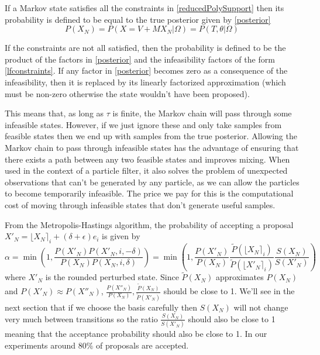 \documentclass{article}
\begin{document}
If a Markov state satisfies all the constraints in \eqref{reducedPolySupport} then its probability is defined to be equal to the true posterior given by \eqref{posterior}
\[
P(X_N) = P(X=V + MX_N|\Omega) = P(T,\theta|\Omega)
\]

If the constraints are not all satisfied, then the probability is defined to be the product of the factors in \eqref{posterior} and the infeasibility factors of the form \eqref{lfconstraints}. If any factor in \eqref{posterior} becomes zero as a consequence of the infeasibility, then it is replaced by its linearly factorized approximation (which must be non-zero otherwise the state wouldn't have been proposed).

This means that, as long as $\tau$ is finite, the Markov chain will pass through some infeasible states. However, if we just ignore these and only take samples from feasible states then we end up with samples from the true posterior. Allowing the Markov chain to pass through infeasible states has the advantage of ensuring that there exists a path between any two feasible states and improves mixing. When used in the context of a particle filter, it also solves the problem of unexpected observations that can't be generated by any particle, as we can allow the particles to become temporarily infeasible. The price we pay for this is the computational cost of moving through infeasible states that don't generate useful samples.

From the Metropolis-Hastings algorithm, the probability of accepting a proposal $X'_N = \lfloor X_N \rceil_i + (\delta + \epsilon)e_i$ is given by
\[
\alpha = 
\min\left( 1, \frac{P(X'_N)P(X'_N, i, -\delta)}{P(X_N)P(X_N,i,\delta)} \right) = \min\left(1, 
\frac{P(X'_N)}{P(X_N)} \frac{\tilde{P}(\lfloor X_N \rceil_i)}{\tilde{P}(\lfloor X'_N \rceil_i)}  \frac{S(X_N)}{S(X'_N)}\right)
\]
where $X'_N$ is the rounded perturbed state. Since $\tilde{P}(X_N)$ approximates $P(X_N)$ and $P(X'_N) \approx P(X''_N)$, $\frac{P(X''_N)}{P(X_N)}, \frac{\tilde{P}(X_N)}{\tilde{P}(X'_N)}$ should be close to 1. We'll see in the next section that if we choose the basis carefully then $S(X_N)$ will not change very much between transitions so the ratio $ \frac{S(X_N)}{S(X'_N)}$ should also be close to 1 meaning that the acceptance probability should also be close to 1. In our experiments around $80\%$ of proposals are accepted.
\end{document}
